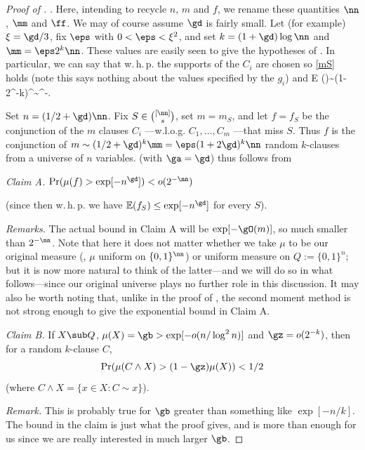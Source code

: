 \mn
%
%
\begin{proof}[Proof of ].   %
Here, intending to recycle $n$, $m$ and $f$, we rename
these quantities
$\nn$, $\mm$ and $\ff$.
We may of course assume $\gd$ is fairly small.
Let (for example) $\xi = \gd/3$, fix $\eps$ with
$0<\eps < \xi^2$, and set
$k=(1+\gd)\log \nn$ and $\mm = \eps 2^k \nn$.
These values are easily seen to give the hypotheses of
 .
In particular, we can say that w.\,h.\,p.
the supports of the %
$C_i$  %
are chosen so \eqref{mS} holds
(note this says nothing about the values specified by
%
the $g_i$) %
and
\mathbb E (\ff)\sim (1-2^{-k})^\mm\sim \eee^{-\eps \nn}.
\enq




Set $n=(1/2+\gd) \nn$.
Fix %
$S\in \binom{[\nn]}{s}$, %
set $m=m_S$,
and
let $f=f_S$ be the %
conjunction  %
of the $m$ %
clauses $C_i$%
---w.l.o.g. %
$C_1,\dots, C_m$%
---that miss $S$.
Thus $f$ is the %
conjunction of %
$m\sim (1/2+\gd)^k\mm =\eps (1+2\gd)^k\nn$
random $k$-clauses from a universe of $n$ variables.
 (with $\ga=\gd$) thus follows from

\mn
\emph{Claim A.}
$\Pr(\mu(f)  > \exp[-n^{\gd}]) < o(2^{-\nn})$

\mn
(since then w.\,h.\,p. we have $\mathbb E (f_S)\leq \exp[-n^{\gd}]$ for every $S$).


\mn
\emph{Remarks.}
The actual bound in Claim A will be
$\exp[-\gO(m)]$,
so much smaller than $2^{-\nn}$.
Note that here it %
does not %
matter whether we take $\mu$ to be
our original measure (\ie, $\mu$ uniform on $\{0,1\}^\nn$)
or uniform measure on $Q:=\{0,1\}^n$;
but it is %
now more natural to think of
the latter---and we will do so in what follows---since
our original universe plays no further role in this discussion.
It may also be worth noting that, unlike in the proof of
, the second moment method is not strong
enough to give the exponential bound in Claim A.




\mn
\emph{Claim B.}
If $X\sub Q$,
$\mu (X) =\gb> \exp[-o(n/\log^2n)]$ and $\gz =o(2^{-k})$,
then for a random $k$-clause $C$,
$$
\Pr(\mu (C\wedge X) >(1-\gz)\mu (X)) < 1/2
$$
(where $C\wedge X =\{x\in X: C\sim x\}$).


\mn
\emph{Remark.}  This is probably true for
$\gb$ greater than something like $\exp[-n/k]$.
The bound in the claim
is just what the proof gives, and is more than enough
for us since %
we are %
really interested in much larger $\gb$.



\end{proof}
